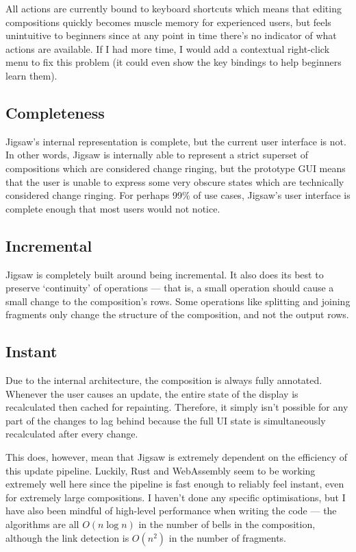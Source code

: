 \documentclass[12pt]{article}
\begin{document}
All actions are currently bound to keyboard shortcuts which means that editing compositions quickly
becomes muscle memory for experienced users, but feels unintuitive to beginners since at any point
in time there's no indicator of what actions are available.  If I had more time, I would add a
contextual right-click menu to fix this problem (it could even show the key bindings to help
beginners learn them).

\subsection{Completeness}

Jigsaw's internal representation is complete, but the current user interface is not.  In other
words, Jigsaw is internally able to represent a strict superset of compositions which are considered
change ringing, but the prototype GUI means that the user is unable to express some very obscure
states which are technically considered change ringing.  For perhaps 99\% of use cases, Jigsaw's
user interface is complete enough that most users would not notice.

\subsection{Incremental}

Jigsaw is completely built around being incremental.  It also does its best to preserve `continuity'
of operations --- that is, a small operation should cause a small change to the composition's rows.
Some operations like splitting and joining fragments only change the structure of the composition,
and not the output rows.

\subsection{Instant}

Due to the internal architecture, the composition is always fully annotated.  Whenever the user
causes an update, the entire state of the display is recalculated then cached for repainting.
Therefore, it simply isn't possible for any part of the changes to lag behind because the full UI
state is simultaneously recalculated after every change.

This does, however, mean that Jigsaw is extremely dependent on the efficiency of this update
pipeline.  Luckily, Rust and WebAssembly seem to be working extremely well here since the pipeline
is fast enough to reliably feel instant, even for extremely large compositions.  I haven't done any
specific optimisations, but I have also been mindful of high-level performance when writing the code
--- the algorithms are all $O(n \log n)$ in the number of bells in the composition, although the
link detection is $O(n^2)$ in the number of fragments.
\end{document}
